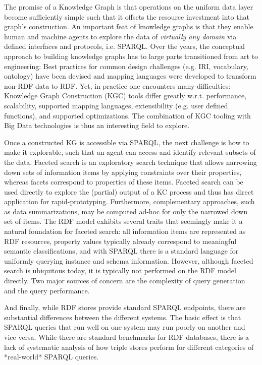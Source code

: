The promise of a Knowledge Graph is that operations on the uniform data layer become sufficiently simple such that it offsets the resource investment into that graph's construction. An important feat of knowledge graphs is that they enable human and machine agents to explore the data of \textit{virtually any domain} via defined interfaces and protocols, i.e. SPARQL. Over the years, the conceptual approach to building knowledge graphs has to large parts transitioned from art to engineering: Best practices for common design challenges (e.g. IRI, vocabulary, ontology) have been devised and mapping languages were developed to transform non-RDF data to RDF. Yet, in practice one encounters many difficulties: Knowledge Graph Construction (KGC) tools differ greatly w.r.t. performance, scalability, supported mapping languages, extensibility (e.g. user defined functions), and supported optimizations. The combination of KGC tooling with Big Data technologies is thus an interesting field to explore.

Once a constructed KG is accessible via SPARQL, the next challenge is how to make it explorable, such that an agent can access and identify relevant subsets of the data. Faceted search is an exploratory search technique that allows narrowing down sets of information items by applying constraints over their properties, whereas facets correspond to properties of these items. Faceted search can be used directly to explore the (partial) output of a KC process and thus has direct application for rapid-prototyping. Furthermore, complementary approaches, such as data summarizations, may be computed ad-hoc for only the narrowed down set of items. The RDF model exhibits several traits that seemingly make it a natural foundation for faceted search: all information items are represented as RDF resources, property values typically already correspond to meaningful semantic classifications, and with SPARQL there is a standard language for uniformly querying instance and schema information. However, although faceted search is ubiquitous today, it is typically not performed on the RDF model directly. Two major sources of concern are the complexity of query generation and the query performance.

And finally, while RDF stores provide standard SPARQL endpoints, there are substantial differences between the different systems. The basic effect is that SPARQL queries that run well on one system may run poorly on another and vice versa. While there are standard benchmarks for RDF databases, there is a lack of systematic analysis of how triple stores perform for different categories of *real-world* SPARQL queries.

